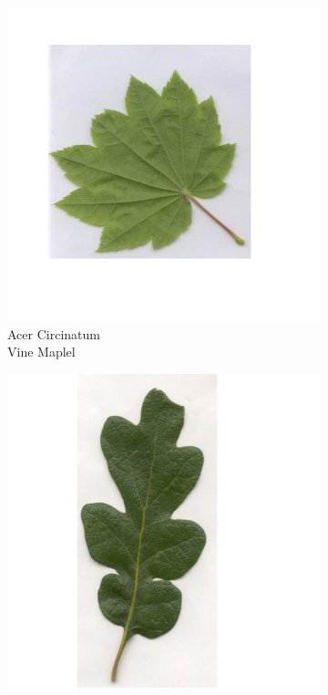 \documentclass[12pt]{article}
\begin{document}
\begin{figure}[b!]
\centering
\begin{subfigure}[b]{0.3\textwidth}
\includegraphics[width=\textwidth]{circinatum_sample.jpg}
\caption{Acer Circinatum\\Vine Maplel}
\end{subfigure}
\begin{subfigure}[b]{0.3\textwidth}
\includegraphics[width=\textwidth]{garryana_sample.jpg}

\end{subfigure}
\end{figure}
\end{document}
